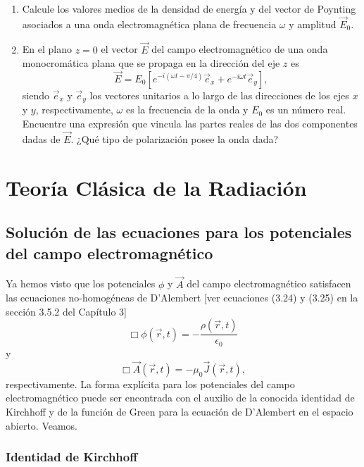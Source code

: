 \documentclass[12pt,a4paper]{book}
\begin{document}
\begin{enumerate}
\item Calcule los valores medios de la densidad de energía y del vector de Poynting asociados a una onda electromagnética plana de frecuencia $\omega$ y amplitud $\vec{E}_0$.

\item En el plano $z = 0$ el vector $\vec{E}$ del campo electromagnético de una onda monocromática plana que se propaga en la dirección del eje $z$ es
\begin{equation*}
\vec{E} = E_0 \left[ e^{-i(\omega t - \pi/4)}\vec{e}_x + e^{-i\omega t}\vec{e}_y \right],
\end{equation*}
siendo $\vec{e}_x$ y $\vec{e}_y$ los vectores unitarios a lo largo de las direcciones de los ejes $x$ y $y$, respectivamente, $\omega$ es la frecuencia de la onda y $E_0$ es un número real. Encuentre una expresión que vincula las partes reales de las dos componentes dadas de $\vec{E}$. ¿Qué tipo de polarización posee la onda dada?
\end{enumerate}

\chapter{Teoría Clásica de la Radiación}
\section{Solución de las ecuaciones para los potenciales del campo electromagnético}

Ya hemos visto que los potenciales $\phi$ y $\vec{A}$ del campo electromagnético satisfacen las ecuaciones no-homogéneas de D'Alembert [ver ecuaciones (3.24) y (3.25) en la sección 3.5.2 del Capítulo 3]
\begin{equation}
\Box\phi(\vec{r}, t) = -\frac{\rho(\vec{r}, t)}{\epsilon_0}
\end{equation}
y
\begin{equation}
\Box\vec{A}(\vec{r}, t) = -\mu_0 \vec{J}(\vec{r}, t),
\end{equation}
respectivamente. La forma explícita para los potenciales del campo electromagnético puede ser encontrada con el auxilio de la conocida identidad de Kirchhoff y de la función de Green para la ecuación de D'Alembert en el espacio abierto. Veamos.

\subsection{Identidad de Kirchhoff}
\end{document}
